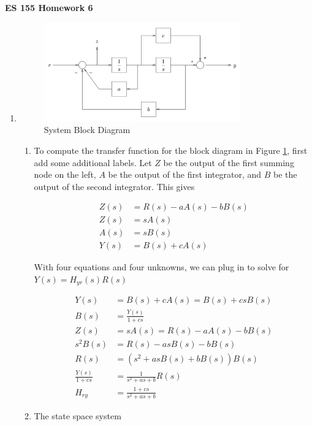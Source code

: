 \documentclass[11pt]{article}
\theoremstyle{definition}
\begin{document}
\textbf{\huge{ES 155 Homework 6}}    %
\normalsize

\begin{enumerate}
    \item %
    \begin{figure}[H]
        \centering
        \includegraphics[width = 0.8\textwidth]{ES155P6_1block.png}
        \caption{System Block Diagram}
        \label{fig:problem1block}
    \end{figure}
    \begin{enumerate}
        \item %
        To compute the transfer function for the block diagram in Figure \ref{fig:problem1block}, first add some additional labels.  Let $Z$ be the output of the first summing node on the left, $A$ be the output of the first integrator, and $B$ be the output of the second integrator.  This gives

        \begin{align*}
            Z(s) &= R(s) - aA(s) - bB(s) \\
            Z(s) &= sA(s) \\
            A(s) &= sB(s) \\
            Y(s) &= B(s) + cA(s)
        \end{align*}

        With four equations and four unknowns, we can plug in to solve for $Y(s) = H_{yr}(s) R(s)$

        \begin{align*}
            Y(s) &= B(s) + cA(s) = B(s) + csB(s) \\
            B(s) &= \frac{Y(s)}{1 + cs} \\
            Z(s) &= sA(s) = R(s) - aA(s) - bB(s) \\
            s^2 B(s) &= R(s) - asB(s) - bB(s) \\
            R(s) &= \left( s^2 + asB(s) + bB(s) \right)B(s) \\
            \frac{Y(s)}{1 + cs} &= \frac{1}{s^2 + as + b}R(s) \\
            H_{ry} &= \frac{1 + cs}{s^2 + as + b}
        \end{align*}
        \item %
        The state space system


\end{enumerate}
\end{enumerate}
\end{document}

